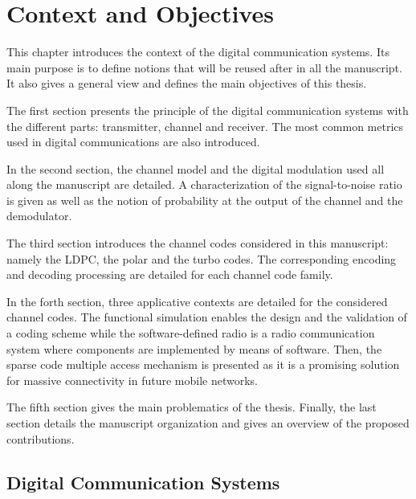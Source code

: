 
\newcommand{\curChapter}{main/chapter1}

\chapter{Context and Objectives}
\label{chap:ctx}

This chapter introduces the context of the digital communication systems. Its
main purpose is to define notions that will be reused after in all the
manuscript. It also gives a general view and defines the main
objectives of this thesis.

The first section presents the principle of the digital communication systems
with the different parts: transmitter, channel and receiver.
The most common metrics used in digital communications are also introduced.

In the second section, the channel model and the digital modulation used all
along the manuscript are detailed. A characterization of the signal-to-noise
ratio is given as well as the notion of probability at the output of the channel
and the demodulator.

The third section introduces the channel codes considered in this manuscript:
namely the LDPC, the polar and the turbo codes. The corresponding encoding and
decoding processing are detailed for each channel code family.

In the forth section, three applicative contexts are detailed for the considered
channel codes. The functional simulation enables the design and the
validation of a coding scheme while the software-defined radio is a radio
communication system where components are implemented by means of software.
Then, the sparse code multiple access mechanism is presented as it is a
promising solution for massive connectivity in future mobile networks.

The fifth section gives the main problematics of the thesis. Finally, the last
section details the manuscript organization and gives an overview of the
proposed contributions.

\vspace*{\fill}
\minitoccustom
\vspace*{\fill}

\section{Digital Communication Systems}
\label{sec:ctx_digital_communication_systems}

